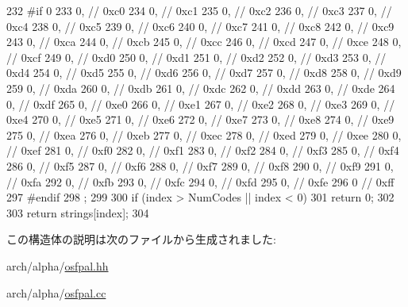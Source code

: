 \begin{DoxyCode}
{{232 #if 0
233         0,              // 0xc0
234         0,              // 0xc1
235         0,              // 0xc2
236         0,              // 0xc3
237         0,              // 0xc4
238         0,              // 0xc5
239         0,              // 0xc6
240         0,              // 0xc7
241         0,              // 0xc8
242         0,              // 0xc9
243         0,              // 0xca
244         0,              // 0xcb
245         0,              // 0xcc
246         0,              // 0xcd
247         0,              // 0xce
248         0,              // 0xcf
249         0,              // 0xd0
250         0,              // 0xd1
251         0,              // 0xd2
252         0,              // 0xd3
253         0,              // 0xd4
254         0,              // 0xd5
255         0,              // 0xd6
256         0,              // 0xd7
257         0,              // 0xd8
258         0,              // 0xd9
259         0,              // 0xda
260         0,              // 0xdb
261         0,              // 0xdc
262         0,              // 0xdd
263         0,              // 0xde
264         0,              // 0xdf
265         0,              // 0xe0
266         0,              // 0xe1
267         0,              // 0xe2
268         0,              // 0xe3
269         0,              // 0xe4
270         0,              // 0xe5
271         0,              // 0xe6
272         0,              // 0xe7
273         0,              // 0xe8
274         0,              // 0xe9
275         0,              // 0xea
276         0,              // 0xeb
277         0,              // 0xec
278         0,              // 0xed
279         0,              // 0xee
280         0,              // 0xef
281         0,              // 0xf0
282         0,              // 0xf1
283         0,              // 0xf2
284         0,              // 0xf3
285         0,              // 0xf4
286         0,              // 0xf5
287         0,              // 0xf6
288         0,              // 0xf7
289         0,              // 0xf8
290         0,              // 0xf9
291         0,              // 0xfa
292         0,              // 0xfb
293         0,              // 0xfc
294         0,              // 0xfd
295         0,              // 0xfe
296         0               // 0xff
297 #endif
298     };
299 
300     if (index > NumCodes || index < 0)
301         return 0;
302 
303     return strings[index];
304 }
\end{DoxyCode}


この構造体の説明は次のファイルから生成されました:\begin{DoxyCompactItemize}
\item 
arch/alpha/\hyperlink{osfpal_8hh}{osfpal.hh}\item 
arch/alpha/\hyperlink{osfpal_8cc}{osfpal.cc}\end{DoxyCompactItemize}
